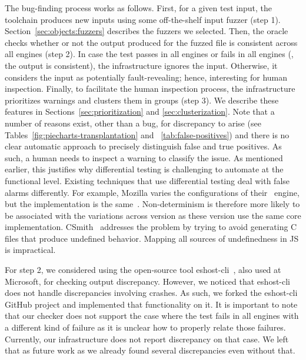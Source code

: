 \documentclass[smallextended]{svjour3}
\begin{document}
The bug-finding process works as follows. First, for a given test
input, the toolchain produces new inputs using some off-the-shelf
input fuzzer (step 1). Section~\ref{sec:objects:fuzzers} describes the
fuzzers we selected. Then, the oracle checks whether or not the output
produced for the fuzzed file is consistent across all engines (step
2). In case the test passes in all engines or fails in all engines
(\ie{}, the output is consistent), the infrastructure ignores the
input. Otherwise, it considers the input as potentially
fault-revealing; hence, interesting for human inspection. Finally, to
facilitate the human inspection process, the infrastructure
prioritizes warnings and clusters them in groups (step 3). We describe
these features in Sections~\ref{sec:prioritization} and
\ref{sec:clusterization}. Note that a number of reasons exist, other
than a bug, for discrepancy to arise (see
Tables~\ref{fig:piecharts-transplantation} and
~\ref{tab:false-positives}) and there is no clear automatic approach
to precisely distinguish false and true positives. As such, a human
needs to inspect a warning to classify the issue. As mentioned
earlier, this justifies why differential testing is challenging to
automate at the functional level. Existing techniques that use
differential testing deal with false alarms differently. For example,
Mozilla varies the configurations of their \smonkey\ engine, but the
implementation is the same~\cite{mozilla-severity}. Non-determinism is
therefore more likely to be associated with the variations across
version as these version use the same core
implementation. CSmith~\cite{Yang:2011:FUB:1993498.1993532} addresses
the problem by trying to avoid generating C files that produce
undefined behavior. Mapping all sources of undefinedness in JS is
impractical.


For step 2, we considered using the open-source tool
eshost-cli~\cite{eshost-cli}, also used at Microsoft, for checking
output discrepancy. However, we noticed that eshost-cli does not
handle discrepancies involving crashes. As such, we forked the
eshost-cli GitHub project and implemented that functionality on it. It
is important to note that our checker does not support the case where
the test fails in all engines with a different kind of failure as it
is unclear how to properly relate those failures. Currently, our
infrastructure does not report discrepancy on that case. We left that
as future work as we already found several discrepancies even without
that.
\end{document}
